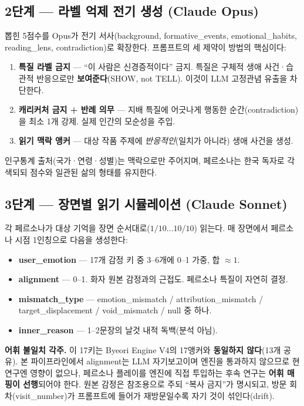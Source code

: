 \documentclass[11pt, a4paper]{article}
\begin{document}
\subsection{2단계 --- 라벨 억제 전기 생성 (Claude Opus)}

뽑힌 5점수를 Opus가 전기 서사(background, formative\_events, emotional\_habits, reading\_lens, contradiction)로 확장한다. 프롬프트의 세 제약이 방법의 핵심이다:

\begin{enumerate}
  \item \textbf{특질 라벨 금지} --- ``이 사람은 신경증적이다'' 금지. 특질은 구체적 생애 사건·습관적 반응으로만 \textbf{보여준다}(SHOW, not TELL). 이것이 LLM 고정관념 유출을 차단한다.
  \item \textbf{캐리커처 금지 + 반례 의무} --- 지배 특질에 어긋나게 행동한 순간(contradiction)을 최소 1개 강제. 실제 인간의 모순성을 주입.
  \item \textbf{읽기 맥락 앵커} --- 대상 작품 주제에 \textit{반응적인}(일치가 아니라) 생애 사건을 생성.
\end{enumerate}

인구통계 출처(국가·연령·성별)는 맥락으로만 주어지며, 페르소나는 한국 독자로 각색되되 점수와 일관된 삶의 형태를 유지한다.

\subsection{3단계 --- 장면별 읽기 시뮬레이션 (Claude Sonnet)}

각 페르소나가 대상 기억을 장면 순서대로($1/10 \ldots 10/10$) 읽는다. 매 장면에서 페르소나 시점 1인칭으로 다음을 생성한다:

\begin{itemize}
  \item \textbf{user\_emotion} --- 17개 감정 키 중 3--6개에 0--1 가중, 합 $\approx 1$.
  \item \textbf{alignment} --- 0--1. 화자 원본 감정과의 근접도. 페르소나 특질이 자연히 결정.
  \item \textbf{mismatch\_type} --- emotion\_mismatch / attribution\_mismatch / target\_displacement / void\_mismatch / null 중 하나.
  \item \textbf{inner\_reason} --- 1--2문장의 날것 내적 독백(분석 아님).
\end{itemize}

\noindent\textbf{어휘 불일치 각주.} 이 17키는 Byeori Engine V4의 17앵커와 \textbf{동일하지 않다}(13개 공유). 본 파이프라인에서 alignment는 LLM 자기보고이며 엔진을 통과하지 않으므로 현 연구엔 영향이 없으나, 페르소나 플레이를 엔진에 직접 투입하는 후속 연구는 \textbf{어휘 매핑이 선행}되어야 한다. 원본 감정은 참조용으로 주되 ``복사 금지''가 명시되고, 방문 회차(visit\_number)가 프롬프트에 들어가 재방문일수록 자기 것이 섞인다(drift).
\end{document}
